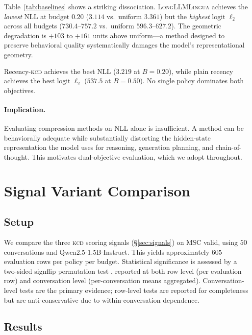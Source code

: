 \documentclass[11pt]{article}
\newcommand{\kcd}{\textsc{kcd}}
\begin{document}
Table~\ref{tab:baselines} shows a striking dissociation.
\textsc{LongLLMLingua} achieves the \emph{lowest} NLL at budget $0.20$
($3.114$ vs.\ uniform $3.361$) but the \emph{highest} logit $\ell_2$
across all budgets ($730.4$--$757.2$ vs.\ uniform $596.3$--$627.2$).
The geometric degradation is $+103$ to $+161$ units above uniform---a
method designed to preserve behavioral quality systematically damages
the model's representational geometry.

Recency-\kcd{} achieves the best NLL ($3.219$ at $B{=}0.20$),
while plain recency achieves the best logit $\ell_2$ ($537.5$ at $B{=}0.50$).
No single policy dominates both objectives.

\paragraph{Implication.}
Evaluating compression methods on NLL alone is insufficient.
A method can be behaviorally adequate while substantially distorting
the hidden-state representation the model uses for reasoning,
generation planning, and chain-of-thought.
This motivates dual-objective evaluation, which we adopt throughout.

\section{Signal Variant Comparison}
\label{sec:variants}

\subsection{Setup}
We compare the three \kcd{} scoring signals (\S\ref{sec:signals}) on MSC valid,
using $50$ conversations and Qwen2.5-1.5B-Instruct.
This yields approximately $605$ evaluation rows per policy per budget.
Statistical significance is assessed by a two-sided signflip permutation test
\citep{ojala-garriga-2010}, reported at both row level (per evaluation row)
and conversation level (per-conversation means aggregated).
Conversation-level tests are the primary evidence; row-level tests are reported
for completeness but are anti-conservative due to within-conversation dependence.

\subsection{Results}
\end{document}
